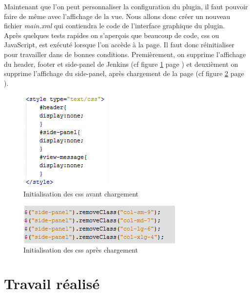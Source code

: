 Maintenant que l'on peut personnaliser la configuration du plugin, il faut pouvoir faire de même avec l'affichage de la vue. Nous allons donc créer un nouveau fichier \emph{main.xml} qui contiendra le code de l'interface graphique du plugin.\\

Après quelques tests rapides on s'aperçois que beaucoup de code, css ou JavaScript, est exécuté lorsque l'on accède à la page. Il faut donc réinitialiser pour travailler dans de bonnes conditions. Premièrement, on supprime l'affichage du header, footer et side-panel de Jenkins (cf figure \ref{figure:cssInit} page \pageref{figure:cssInit}) et deuxièment on supprime l'affichage du side-panel, après chargement de la page (cf figure \ref{figure:cssInitJS} page \pageref{figure:cssInitJS}).\\

\begin{figure}[!h]
  \centering
      \includegraphics{images/cssInit.png}
  \caption{Initialisation des css avant chargement}
	\label{figure:cssInit}
\end{figure}

\begin{figure}[!h]
  \centering
      \includegraphics{images/cssInitJS.png}
  \caption{Initialisation des css après chargement}
	\label{figure:cssInitJS}
\end{figure}


\section{Travail réalisé}




